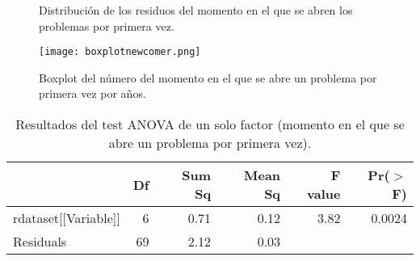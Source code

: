 \begin{figure}[H]
\centering
{}\qquad
{}
\caption{Distribución de los residuos del momento en el que se abren los problemas por primera vez.}
\label{fig:newcomer}
\end{figure}

\begin{figure}[H]
    \centering
    \texttt{[image: boxplotnewcomer.png]}
    \caption{Boxplot del número del momento en el que se abre un problema por primera vez por años.}
    \label{fig:boxplotnewcomer}
\end{figure}

\begin{table}[H]
\centering
\caption{Resultados del test ANOVA de un solo factor (momento en el que se abre un problema por primera vez).}
\label{tab:ANOVAnewcomer}
\begin{tabular}{lrrrrr}
  \hline
 & Df & Sum Sq & Mean Sq & F value & Pr($>$F) \\ 
  \hline
rdataset[[Variable]] & 6 & 0.71 & 0.12 & 3.82 & 0.0024 \\ 
  Residuals            & 69 & 2.12 & 0.03 &  &  \\ 
   \hline
\end{tabular}
\end{table}

